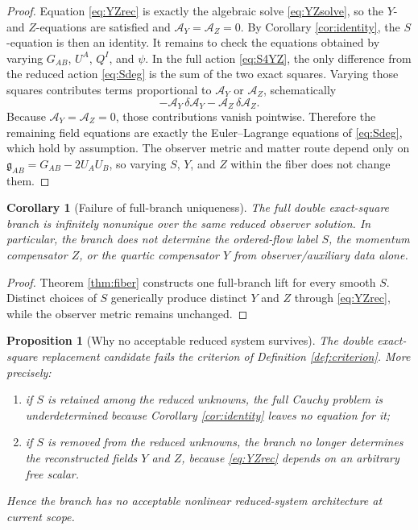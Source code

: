 \documentclass[11pt]{article}
\newcommand{\BridgeMetric}{\mathfrak{g}}
\newcommand{\AY}{\mathcal A_Y}
\newcommand{\AZ}{\mathcal A_Z}
\newtheorem{proposition}{Proposition}
\newtheorem{corollary}{Corollary}
\begin{document}
\begin{proof}
Equation \eqref{eq:YZrec} is exactly the algebraic solve \eqref{eq:YZsolve}, so the \(Y\)- and \(Z\)-equations are satisfied and \(\AY=\AZ=0\). By Corollary \ref{cor:identity}, the \(S\)-equation is then an identity. It remains to check the equations obtained by varying \(G_{AB}\), \(U^A\), \(Q^I\), and \(\psi\). In the full action \eqref{eq:S4YZ}, the only difference from the reduced action \eqref{eq:Sdeg} is the sum of the two exact squares. Varying those squares contributes terms proportional to \(\AY\) or \(\AZ\), schematically
\[
-\AY\,\delta\AY-\AZ\,\delta\AZ.
\]
Because \(\AY=\AZ=0\), those contributions vanish pointwise. Therefore the remaining field equations are exactly the Euler--Lagrange equations of \eqref{eq:Sdeg}, which hold by assumption. The observer metric and matter route depend only on \(\BridgeMetric_{AB}=G_{AB}-2U_AU_B\), so varying \(S\), \(Y\), and \(Z\) within the fiber does not change them.
\end{proof}

\begin{corollary}[Failure of full-branch uniqueness]
\label{cor:nonunique}
The full double exact-square branch is infinitely nonunique over the same reduced observer solution. In particular, the branch does not determine the ordered-flow label \(S\), the momentum compensator \(Z\), or the quartic compensator \(Y\) from observer/auxiliary data alone.
\end{corollary}

\begin{proof}
Theorem \ref{thm:fiber} constructs one full-branch lift for every smooth \(S\). Distinct choices of \(S\) generically produce distinct \(Y\) and \(Z\) through \eqref{eq:YZrec}, while the observer metric remains unchanged.
\end{proof}

\begin{proposition}[Why no acceptable reduced system survives]
\label{prop:noreducedsystem}
The double exact-square replacement candidate fails the criterion of Definition \ref{def:criterion}. More precisely:
\begin{enumerate}
    \item if \(S\) is retained among the reduced unknowns, the full Cauchy problem is underdetermined because Corollary \ref{cor:identity} leaves no equation for it;
    \item if \(S\) is removed from the reduced unknowns, the branch no longer determines the reconstructed fields \(Y\) and \(Z\), because \eqref{eq:YZrec} depends on an arbitrary free scalar.
\end{enumerate}
Hence the branch has no acceptable nonlinear reduced-system architecture at current scope.
\end{proposition}
\end{document}
